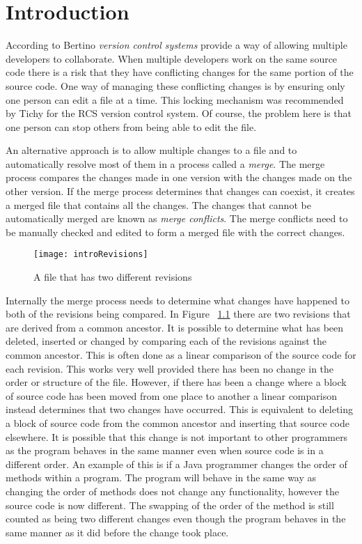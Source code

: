 
\chapter{Introduction}\label{C:intro}

According to Bertino \cite{Bertino2012} \emph{version control systems} provide a way of allowing multiple developers to collaborate. When multiple developers work on the same source code there is a risk that they have conflicting changes for the same portion of the source code.  One way of managing these conflicting changes is by ensuring only one person can edit a file at a time. This locking mechanism was recommended by Tichy \cite{Tichy1982} for the RCS version control system. Of course, the problem here is that one person can stop others from being able to edit the file. 

An alternative approach is to allow multiple changes to a file and to automatically resolve most of them in a process called a \emph{merge}.  The merge process compares the changes made in one version with the changes made on the other version. If the merge process determines that changes can coexist, it creates a merged file that contains all the changes. The changes that cannot be automatically merged are known as \emph{merge conflicts}.  The merge conflicts need to be manually checked and edited to form a merged file with the correct changes.

\begin{figure}[!t]
 \begin{center}
 \texttt{[image: introRevisions]}
 \end{center}
 \caption{A file that has two different revisions}
 \label{fig:introRevisions}
\end{figure}

Internally the merge process needs to determine what changes have happened to both of the revisions being compared. In Figure  ~\ref{fig:introRevisions} there are two revisions that are derived from a common ancestor. It is possible to determine what has been deleted, inserted or changed by comparing each of the revisions against the common ancestor.  This is often done as a linear comparison of the source code for each revision. This works very well provided there has been no change in the order or structure of the file. However, if there has been a change where a block of source code has been moved from one place to another a linear comparison instead determines that two changes have occurred.  This is equivalent to deleting a block of source code from the common ancestor and inserting that source code elsewhere. It is possible that this change is not important to other programmers as the program behaves in the same manner even when source code is in a different order.  An example of this is if a Java programmer changes the order of methods within a program.  The program will behave in the same way as changing the order of methods does not change any functionality, however the source code is now different. The swapping of the order of the method is still counted as being two different changes even though the program behaves in the same manner as it did before the change took place.

